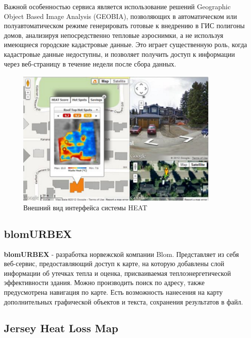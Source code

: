 	Важной особенностью сервиса является использование решений Geographic Object Based Image Analysis ({GEOBIA}), позволяющих в автоматическом или полуавтоматическом режиме генерировать готовые к внедрению в ГИС полигоны домов, анализируя непосредственно тепловые аэроснимки, а не используя имеющиеся городские кадастровые данные. Это играет существенную роль, когда кадастровые данные недоступны, и позволяет получить доступ к информации через веб-страницу в течение недели после сбора данных.

	\begin{figure}[h!]
      \centering
      \includegraphics[width=0.9\textwidth]{images/screens/2_heat.png}
      \caption{Внешний вид интерфейса системы HEAT}
      \label{screens:heat}
    \end{figure}

\subsection{blomURBEX}

\par
	\textbf{blomURBEX} - разработка норвежской компании Blom. Представляет из себя веб-сервис, предоставляющий доступ к карте, на которую добавлены слой информации об утечках тепла и оценка, присваиваемая теплоэнергетической эффективности здания. Можно производить поиск по адресу, также предусмотрена навигация по карте. Есть возможность нанесения на карту дополнительных графической объектов и текста, сохранения результатов в файл.

\subsection{Jersey Heat Loss Map}

